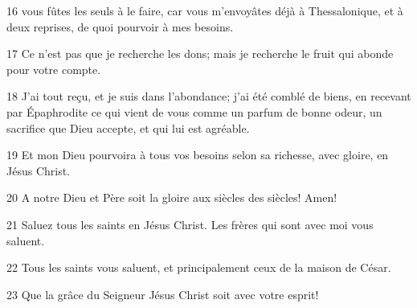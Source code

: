 \par 16 vous fûtes les seuls à le faire, car vous m'envoyâtes déjà à Thessalonique, et à deux reprises, de quoi pourvoir à mes besoins.
\par 17 Ce n'est pas que je recherche les dons; mais je recherche le fruit qui abonde pour votre compte.
\par 18 J'ai tout reçu, et je suis dans l'abondance; j'ai été comblé de biens, en recevant par Épaphrodite ce qui vient de vous comme un parfum de bonne odeur, un sacrifice que Dieu accepte, et qui lui est agréable.
\par 19 Et mon Dieu pourvoira à tous vos besoins selon sa richesse, avec gloire, en Jésus Christ.
\par 20 A notre Dieu et Père soit la gloire aux siècles des siècles! Amen!
\par 21 Saluez tous les saints en Jésus Christ. Les frères qui sont avec moi vous saluent.
\par 22 Tous les saints vous saluent, et principalement ceux de la maison de César.
\par 23 Que la grâce du Seigneur Jésus Christ soit avec votre esprit!


